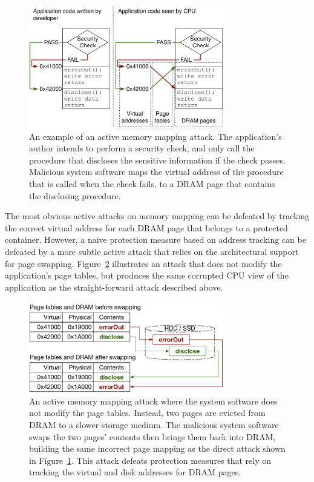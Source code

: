\begin{figure}[hbt]
  \centering
  \includegraphics[width=85mm]{figures/active_mapping_attack.pdf}
  \caption{
    An example of an active memory mapping attack. The application's author
    intends to perform a security check, and only call the procedure that
    discloses the sensitive information if the check passes. Malicious system
    software maps the virtual address of the procedure that is called when the
    check fails, to a DRAM page that contains the disclosing procedure.
  }
  \label{fig:active_mapping_attack}
\end{figure}


\label{sec:page_swapping_attacks}

The most obvious active attacks on memory mapping can be defeated by tracking
the correct virtual address for each DRAM page that belongs to a protected
container. However, a naive protection measure based on address tracking can be
defeated by a more subtle active attack that relies on the architectural
support for page swapping. Figure~\ref{fig:swap_mapping_attack} illustrates an
attack that does not modify the application's page tables, but produces the
same corrupted CPU view of the application as the straight-forward attack
described above.

\begin{figure}[hbt]
  \centering
  \includegraphics[width=85mm]{figures/swap_mapping_attack.pdf}
  \caption{
    An active memory mapping attack where the system software does not modify
    the page tables. Instead, two pages are evicted from DRAM to a slower
    storage medium. The malicious system software swaps the two pages' contents
    then brings them back into DRAM, building the same incorrect page mapping
    as the direct attack shown in Figure~\ref{fig:active_mapping_attack}. This
    attack defeats protection measures that rely on tracking the virtual and
    disk addresses for DRAM pages.
  }
  \label{fig:swap_mapping_attack}
\end{figure}

